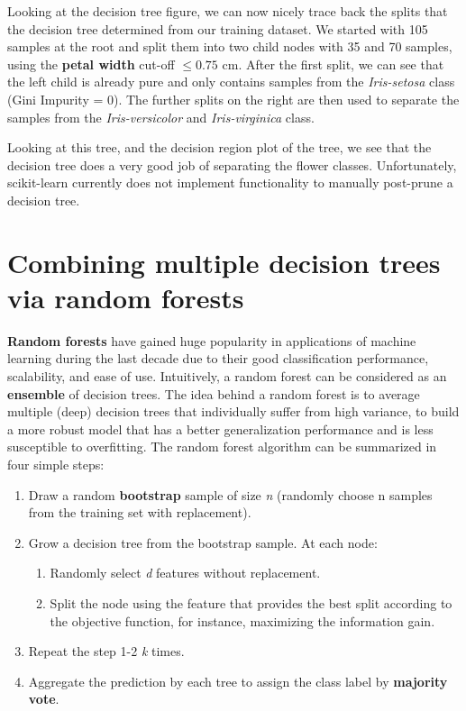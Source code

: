 \documentclass[11pt]{article}
\providecommand{\tightlist}{%
      \setlength{\itemsep}{0pt}\setlength{\parskip}{0pt}}
\begin{document}
    Looking at the decision tree figure, we can now nicely trace back the
splits that the decision tree determined from our training dataset. We
started with 105 samples at the root and split them into two child nodes
with 35 and 70 samples, using the \textbf{petal width} cut-off
\(\le 0.75\) cm. After the first split, we can see that the left child
is already pure and only contains samples from the \emph{Iris-setosa}
class (Gini Impurity = 0). The further splits on the right are then used
to separate the samples from the \emph{Iris-versicolor} and
\emph{Iris-virginica} class.

Looking at this tree, and the decision region plot of the tree, we see
that the decision tree does a very good job of separating the flower
classes. Unfortunately, scikit-learn currently does not implement
functionality to manually post-prune a decision tree.

    \section{Combining multiple decision trees via random
forests}\label{combining-multiple-decision-trees-via-random-forests}

    \textbf{Random forests} have gained huge popularity in applications of
machine learning during the last decade due to their good classification
performance, scalability, and ease of use. Intuitively, a random forest
can be considered as an \textbf{ensemble} of decision trees. The idea
behind a random forest is to average multiple (deep) decision trees that
individually suffer from high variance, to build a more robust model
that has a better generalization performance and is less susceptible to
overfitting. The random forest algorithm can be summarized in four
simple steps:

\begin{enumerate}
\def\labelenumi{\arabic{enumi}.}
\tightlist
\item
  Draw a random \textbf{bootstrap} sample of size \emph{n} (randomly
  choose n samples from the training set with replacement).
\item
  Grow a decision tree from the bootstrap sample. At each node:

  \begin{enumerate}
  \def\labelenumii{\arabic{enumii}.}
  \tightlist
  \item
    Randomly select \emph{d} features without replacement.
  \item
    Split the node using the feature that provides the best split
    according to the objective function, for instance, maximizing the
    information gain.
  \end{enumerate}
\item
  Repeat the step 1-2 \emph{k} times.
\item
  Aggregate the prediction by each tree to assign the class label by
  \textbf{majority vote}.
\end{enumerate}
\end{document}
